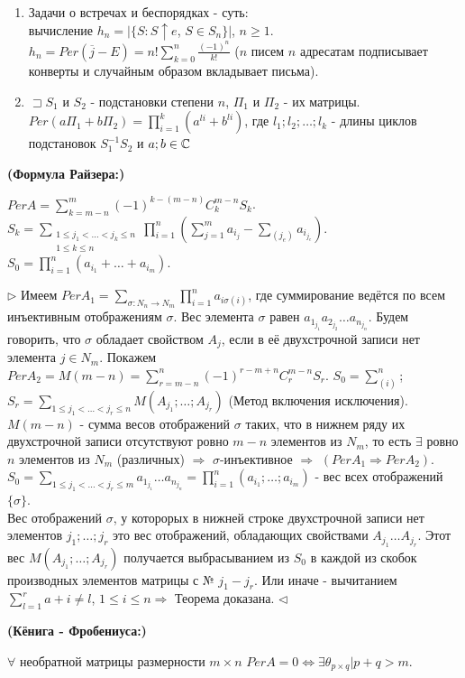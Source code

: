 \begin{enumerate}
    \item Задачи о встречах и беспорядках - суть: \\вычисление $h_n=|\{S:S\uparrow e$, $S\in S_n \}|$, $n \geq 1$. \\$h_n=Per(\overline j - E)=n! \sum\limits_{k=0}^n \frac{(-1)^n}{k!}$ ($n$ писем $n$ адресатам подписывает конверты и случайным образом вкладывает письма).
    \item $\sqsupset S_1$ и $S_2$ - подстановки степени $n$, $\Pi_1$ и $\Pi_2$ - их матрицы. \\$Per(a\Pi_1+b\Pi_2) = \prod\limits_{i=1}^k (a^{li}+b^{li})$, где $l_1;l_2;\ldots;l_k$ - длины циклов подстановок $S^{-1}_1 S_2$ и $a;b \in \mathbb{C}$
\end{enumerate}

\thr \textbf{(Формула Райзера:)}

$PerA=\sum\limits_{k=m-n}^m(-1)^{k-(m-n)}C^{m-n}_k S_k$.\\$S_k=\sum\limits_{\substack{1 \leq j_1 < \ldots < j_k \leq n\\1 \leq k \leq n}} \prod\limits_{i=1}^n(\sum\limits_{j=1}^m a_{i_j} -\sum\limits_{(j_e)} a_{i_{j_e}})$. 
$S_0=\prod\limits_{i=1}^n(a_{i_1}+\ldots+a_{i_m})$.

\proof
$\rhd$ Имеем $PerA_1=\sum\limits_{\sigma:N_n \rightarrow N_m}\prod\limits_{i=1}^n a_{i\sigma(i)}$, где суммирование ведётся по всем инъективным отображениям $\sigma$. Вес элемента $\sigma$ равен $a_{1_{j_1}}a_{2_{j_2}}\ldots a_{n_{j_n}}$. Будем говорить, что $\sigma$ обладает свойством $A_j$, если в её двухстрочной записи нет элемента $j\in N_m$. 
Покажем $PerA_2=M(m-n)=\sum\limits_{r=m-n}^n (-1)^{r-m+n}C^{m-n}_r S_r$. $S_0=\sum\limits_{(i)}^n$; $S_r=\sum\limits_{1\leq j_1<\ldots<j_r\leq n}M(A_{j_1};\ldots;A_{j_r})$ (Метод включения исключения).
$M(m-n)$ - сумма весов отображений $\sigma$ таких, что в нижнем ряду их двухстрочной записи отсутствуют ровно $m-n$ элементов из $N_m$, то есть $\exists$ ровно $n$ элементов из $N_m$ (различных) $\Rightarrow$ $\sigma$-инъективное $\Rightarrow$ $(PerA_1 \Rightarrow PerA_2)$.
$S_0=\sum\limits_{1\leq j_1<\ldots<j_r\leq m}a_{1_{j_1}}\ldots a_{n_{j_n}}=\prod\limits_{i=1}^n(a_{i_1};\ldots;a_{i_m})$ - вес всех отображений $\{\sigma\}$.
\\Вес отображений $\sigma$, у которорых в нижней строке двухстрочной записи нет элементов $j_1;\ldots;j_r$ это вес отображений, обладающих свойствами $A_{j_1}\ldots A_{j_r}$. Этот вес $M(A_{j_1};\ldots;A_{j_r})$ получается выбрасыванием из $S_0$ в каждой из скобок производных элементов матрицы с № $j_1-j_r$. Или иначе - вычитанием $\sum\limits_{l=1}^r a+i\neq l$, $1\leq i\leq n \Rightarrow$ Теорема доказана. $\triangleleft$


\thr \textbf{(Кёнига - Фробениуса:)}

$\forall$ необратной матрицы размерности $m\times n$ 
$PerA=0 \Leftrightarrow \exists  \theta_{p\times q}| p+q>m$.
